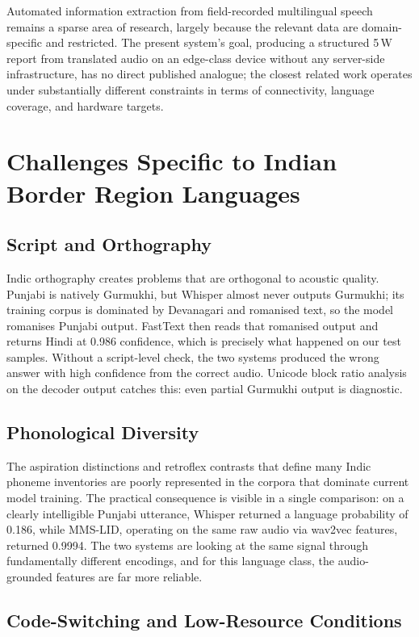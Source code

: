 \documentclass[conference]{IEEEtran}
\begin{document}
Automated information extraction from field-recorded multilingual speech remains a sparse area of research, largely because the relevant data are domain-specific and restricted. The present system's goal, producing a structured 5\,W report from translated audio on an edge-class device without any server-side infrastructure, has no direct published analogue; the closest related work operates under substantially different constraints in terms of connectivity, language coverage, and hardware targets.

\section{Challenges Specific to Indian Border Region Languages}

\subsection{Script and Orthography}

Indic orthography creates problems that are orthogonal to acoustic quality. Punjabi is natively Gurmukhi, but Whisper almost never outputs Gurmukhi; its training corpus is dominated by Devanagari and romanised text, so the model romanises Punjabi output. FastText then reads that romanised output and returns Hindi at 0.986 confidence, which is precisely what happened on our test samples. Without a script-level check, the two systems produced the wrong answer with high confidence from the correct audio. Unicode block ratio analysis on the decoder output catches this: even partial Gurmukhi output is diagnostic.

\subsection{Phonological Diversity}

The aspiration distinctions and retroflex contrasts that define many Indic phoneme inventories are poorly represented in the corpora that dominate current model training. The practical consequence is visible in a single comparison: on a clearly intelligible Punjabi utterance, Whisper returned a language probability of 0.186, while MMS-LID, operating on the same raw audio via wav2vec features, returned 0.9994. The two systems are looking at the same signal through fundamentally different encodings, and for this language class, the audio-grounded features are far more reliable.

\subsection{Code-Switching and Low-Resource Conditions}
\end{document}
